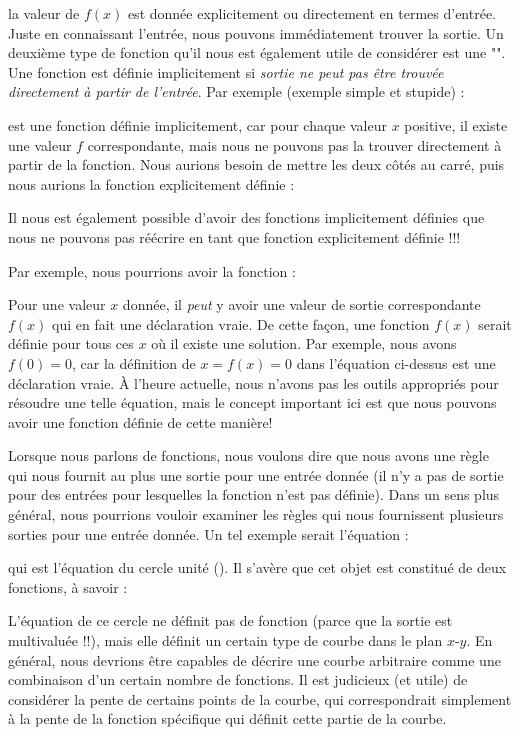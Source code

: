 	la valeur de $f(x)$ est donnée explicitement ou directement en termes d'entrée. Juste en connaissant l'entrée, nous pouvons immédiatement trouver la sortie. Un deuxième type de fonction qu'il nous est également utile de considérer est une "". Une fonction est définie implicitement si {\it sortie ne peut pas être trouvée directement à partir de l'entrée}. Par exemple (exemple simple et stupide) :
	
	est une fonction définie implicitement, car pour chaque valeur $x$ positive, il existe une valeur $f$ correspondante, mais nous ne pouvons pas la trouver directement à partir de la fonction. Nous aurions besoin de mettre les deux côtés au carré, puis nous aurions la fonction explicitement définie :
	 	
	Il nous est également possible d'avoir des fonctions implicitement définies que nous ne pouvons pas réécrire en tant que fonction explicitement définie !!!
	
	Par exemple, nous pourrions avoir la fonction :
	
	Pour une valeur $x$ donnée, il {\it peut} y avoir une valeur de sortie correspondante $f(x)$ qui en fait une déclaration vraie. De cette façon, une fonction $f(x)$ serait définie pour tous ces $x$ où il existe une solution. Par exemple, nous avons $f(0) = 0$, car la définition de $x=f(x)=0$ dans l'équation ci-dessus est une déclaration vraie. À l'heure actuelle, nous n'avons pas les outils appropriés pour résoudre une telle équation, mais le concept important ici est que nous pouvons avoir une fonction définie de cette manière!
	
	Lorsque nous parlons de fonctions, nous voulons dire que nous avons une règle qui nous fournit au plus une sortie pour une entrée donnée (il n'y a pas de sortie pour des entrées pour lesquelles la fonction n'est pas définie). Dans un sens plus général, nous pourrions vouloir examiner les règles qui nous fournissent plusieurs sorties pour une entrée donnée. Un tel exemple serait l'équation :
	
	qui est l'équation du cercle unité (). Il s'avère que cet objet est constitué de deux fonctions, à savoir :
	
	L'équation de ce cercle ne définit pas de fonction (parce que la sortie est multivaluée !!), mais elle définit un certain type de courbe dans le plan $x$-$y$. En général, nous devrions être capables de décrire une courbe arbitraire comme une combinaison d'un certain nombre de fonctions. Il est judicieux (et utile) de considérer la pente de certains points de la courbe, qui correspondrait simplement à la pente de la fonction spécifique qui définit cette partie de la courbe.
	
